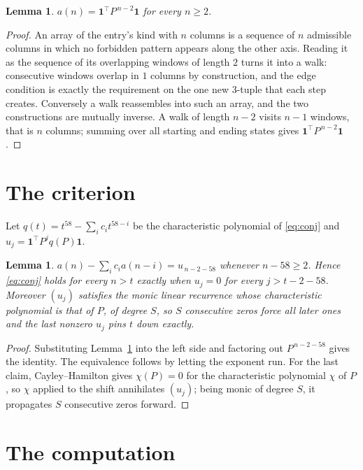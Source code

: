 \documentclass[11pt,a4paper]{article}
\theoremstyle{plain}
\newtheorem{lemma}[theorem]{Lemma}
\theoremstyle{definition}
\begin{document}
\begin{lemma}\label{lem:walk}
$a(n)=\mathbf{1}^{\!\top}P^{\,n-2}\mathbf{1}$ for every $n\ge2$.
\end{lemma}

\begin{proof}
An array of the entry's kind with $n$ columns is a sequence of $n$ admissible columns in
which no forbidden pattern appears along the other axis. Reading it as the sequence of its
overlapping windows of length $2$ turns it into a walk: consecutive windows overlap in
$1$ columns by construction, and the edge condition is exactly the requirement on the one
new $3$-tuple that each step creates. Conversely a walk reassembles into such an array,
and the two constructions are mutually inverse. A walk of length $n-2$ visits $n-1$
windows, that is $n$ columns; summing over all starting and ending states gives
$\mathbf{1}^{\!\top}P^{\,n-2}\mathbf{1}$.
\end{proof}

\section{The criterion}

Let $q(t)=t^{58}-\sum_i c_i t^{58-i}$ be the characteristic polynomial of
\eqref{eq:conj} and $u_j=\mathbf{1}^{\!\top}P^{j}q(P)\mathbf{1}$.

\begin{lemma}\label{lem:crit}
$a(n)-\sum_i c_i a(n-i)=u_{\,n-2-58}$ whenever $n-58\ge2$. Hence
\eqref{eq:conj} holds for every $n>t$ exactly when $u_j=0$ for every
$j>t-2-58$. Moreover $(u_j)$ satisfies the monic linear recurrence whose
characteristic polynomial is that of $P$, of degree $S$, so $S$ consecutive zeros force all
later ones and the last nonzero $u_j$ pins $t$ down exactly.
\end{lemma}

\begin{proof}
Substituting Lemma~\ref{lem:walk} into the left side and factoring out
$P^{\,n-2-58}$ gives the identity. The equivalence follows by letting the exponent
run. For the last claim, Cayley--Hamilton gives $\chi(P)=0$ for the characteristic
polynomial $\chi$ of $P$, so $\chi$ applied to the shift annihilates $(u_j)$; being monic of
degree $S$, it propagates $S$ consecutive zeros forward.
\end{proof}

\section{The computation}
\end{document}
